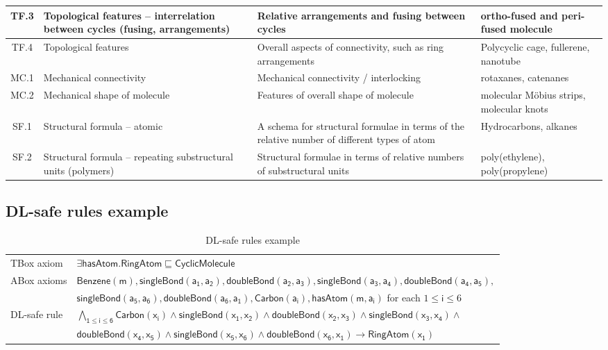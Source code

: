 \documentclass[10pt]{bmc_article}
\newenvironment{bmcformat}{\baselineskip20pt\sloppy\setboolean{publ}{false}}{\baselineskip20pt\sloppy}
\begin{document}
\begin{bmcformat}
{\begin{tabular}{|c|p{3cm}|p{5cm}|p{4cm}|}
        TF.3 & Topological features -- interrelation between cycles (fusing, arrangements)  & Relative arrangements and fusing between cycles  & ortho-fused and peri-fused molecule \\ \hline
        TF.4 & Topological features & Overall aspects of connectivity, such as ring arrangements & Polycyclic cage, fullerene, nanotube \\ \hline
        MC.1 & Mechanical connectivity & Mechanical connectivity / interlocking & rotaxanes, catenanes \\ \hline
        MC.2 & Mechanical shape of molecule & Features of overall shape of molecule & molecular M\"{o}bius strips, molecular knots  \\ \hline
        SF.1 & Structural formula -- atomic & A schema for structural formulae in terms of the relative number of different types of atom & Hydrocarbons, alkanes \\ \hline
        SF.2 & Structural formula -- repeating substructural units (polymers) & Structural formulae in terms of relative numbers of substructural units & poly(ethylene), poly(propylene) \\ \hline
      \end{tabular}
      } 


\subsection*{DL-safe rules example}
\begin{table}[h!]
\centering
\caption{DL-safe rules example}\label{tab:DL-safe-example}
\begin{tabular}{|l|l|}
    \hline
    TBox axiom    & $\mathsf{\exists hasAtom.RingAtom \sqsubseteq CyclicMolecule}$ \\
    ABox axioms & $\mathsf{Benzene(m),singleBond(a_1,a_2),doubleBond(a_2,a_3),singleBond(a_3,a_4),doubleBond(a_4,a_5),}$ \\ 
     & $\mathsf{singleBond(a_5,a_6),doubleBond(a_6,a_1),Carbon(a_i),hasAtom(m,a_i)}$  for each $ 1 \leq \mathsf{i} \leq 6$ \\
     DL-safe rule &  $\mathsf{ \bigwedge_{1 \leq i \leq 6}   Carbon(x_i)   \wedge singleBond(x_1,x_2) \wedge doubleBond(x_2,x_3) \wedge singleBond(x_3,x_4)} \wedge{}$ \\
     & $\mathsf{doubleBond(x_4,x_5) \wedge singleBond(x_5,x_6) \wedge doubleBond(x_6,x_1) \rightarrow RingAtom(x_1)}$ \\
      

\end{tabular}
\end{table}
\end{bmcformat}
\end{document}
